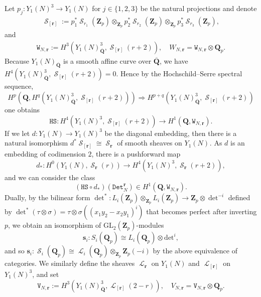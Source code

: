 \documentclass[10pt,letterpaper]{amsart}
\theoremstyle{plain}
\theoremstyle{definition}
\theoremstyle{definition}
\theoremstyle{plain}
\theoremstyle{plain}
\theoremstyle{plain}
\theoremstyle{remark}
\numberwithin{equation}{section}
\DeclareMathOperator{\et}{\acute{e}t}
\DeclareMathOperator{\Ll}{\mathscr{L}}
\DeclareMathOperator{\Ss}{\mathscr{S}}
\newcommand{\Q}{\mathbf{Q}}
\newcommand{\Z}{\mathbf{Z}}
\begin{document}
Let $p_j:Y_1(N)^3\rightarrow Y_1(N)$ for $j\in\{1,2,3\}$ be the natural projections and denote 
\begin{gather*}
\Ss_{[\mathbf{r}]}:=p_1^{*}\Ss_{r_1}(\Z_p)\otimes_{\Z_p}p_2^{*}\Ss_{r_2}(\Z_p)\otimes_{\Z_p}p_3^{*}\Ss_{r_3}(\Z_p),
\end{gather*}
and
\begin{gather*}
\mathtt{W}_{N,\mathbf{r}}:=H^3_{\et}(Y_1(N)^3_{\overline{\Q}},\Ss_{[\mathbf{r}]}(r+2)),\quad W_{N,\mathbf{r}}=\mathtt{W}_{N,\mathbf{r}}\otimes\Q_p.
\end{gather*}
Because $Y_1(N)_{\overline{\Q}}$ is a smooth affine curve over $\overline{\Q}$, we have $H^4_{\et}(Y_1(N)^3_{\overline{\Q}},\Ss_{[\mathbf{r}]}(r+2))=0$. Hence by the Hochschild--Serre spectral sequence, 
\[H^p(\Q,H^q_{\et}(Y_1(N)^3_{\overline{\Q}},\Ss_{[\mathbf{r}]}(r+2)))\Longrightarrow H^{p+q}_{\et}(Y_1(N)^3_{\overline{\Q}},\Ss_{[\mathbf{r}]}(r+2))\]
one obtains
\begin{equation*}
    \mathtt{HS}:H^4_{\et}(Y_1(N)^3,\Ss_{[\mathbf{r}]}(r+2))\rightarrow H^1(\Q,\mathtt{W}_{N,\mathbf{r}}).
\end{equation*}
If we let $d:Y_1(N)\rightarrow Y_1(N)^3$ be the diagonal embedding, then there is a natural isomorphism $d^{*}\Ss_{[\mathbf{r}]}\cong \Ss_{\mathbf{r}}$ of smooth sheaves on $Y_1(N)_{\et}$. As $d$ is an embedding of codimension $2$, there is a pushforward map
\begin{equation*}
    d_{*}:H^0_{\et}(Y_1(N),\Ss_{\mathbf{r}}(r))\rightarrow H^4_{\et}(Y_1(N)^3,\Ss_{\mathbf{r}}(r+2)),
\end{equation*}
and we can consider the class
\begin{equation*}
    (\mathtt{HS}\circ d_{*})(\mathtt{Det}^{\mathbf{r}}_N)\in H^1(\Q,\mathtt{W}_{N,\mathbf{r}}).
\end{equation*}
Dually, by the bilinear form $\det^{*}:L_i(\Z_p)\otimes_{\Z_p}L_i(\Z_p)\rightarrow \Z_p\otimes \det^{-i}$ defined by $\det^{*}(\tau\otimes \sigma)=\tau\otimes\sigma((x_1y_2-x_2y_1)^i)$ that becomes perfect after inverting $p$, we obtain an isomorphism of ${\mathrm{GL}}_2(\Z_p)$-modules
\begin{equation}\label{srlr}
\mathbf{s}_i:S_i(\Q_p)\cong L_i(\Q_p)\otimes\text{det}^i, 
\end{equation}
and so $\mathbf{s}_i:\Ss_i(\Q_p)\cong \Ll_i(\Q_p)\otimes_{\Z_p}\Z_p(-i)$ by the above equivalence of categories. We similarly define the sheaves $\Ll_{\mathbf{r}}$ on $Y_1(N)$ and $\Ll_{[\mathbf{r}]}$ on $Y_1(N)^3$, and set
\begin{equation}
    \mathtt{V}_{N,\mathbf{r}}:=H^3_{\et}(Y_1(N)^3_{\overline{\Q}},\Ll_{[\mathbf{r}]}(2-r)),\quad V_{N,\mathbf{r}}=
    \mathtt{V}_{N,\mathbf{r}}\otimes \Q_p.\nonumber
\end{equation}
\end{document}
